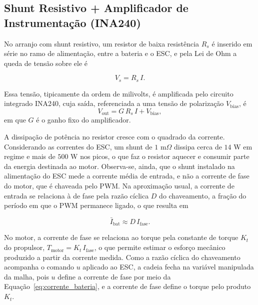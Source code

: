 \subsection{Shunt Resistivo + Amplificador de Instrumentação (INA240)}
\label{sec:ina240}

No arranjo com shunt resistivo, um resistor de baixa resistência $R_s$ é inserido em
série no ramo de alimentação, entre a bateria e o ESC, e pela Lei de Ohm a queda de tensão
sobre ele é

\begin{equation*}
V_s = R_s\,I.
\end{equation*}

Essa tensão, tipicamente da ordem de milivolts, é amplificada pelo circuito integrado INA240, cuja
saída, referenciada a uma tensão de polarização $V_\mathrm{bias}$, é
\begin{equation*}
V_\mathrm{out} = G\,R_s\,I + V_\mathrm{bias},
\end{equation*}
em que $G$ é o ganho fixo do amplificador. 

A dissipação de potência no resistor cresce com o quadrado da corrente. Considerando as correntes do
ESC, um shunt de $1$ m$\Omega$ dissipa cerca de $14$ W
em regime e mais de $500$ W nos picos, o que faz o resistor aquecer e consumir parte da energia
destinada ao motor. Observa-se, ainda, que o shunt instalado na alimentação do ESC mede a
corrente média de entrada, e não a corrente de fase do motor, que é chaveada pelo PWM. Na aproximação
usual, a corrente de entrada se relaciona à de fase pela razão cíclica $D$ do chaveamento, a
fração do período em que o PWM permanece ligado, o que resulta em

\begin{equation}\label{eq:corrente_bateria}
\bar{I}_\mathrm{bat} \approx D\,I_\mathrm{fase}.
\end{equation}

No motor, a corrente de fase se relaciona ao torque pela constante de torque $K_t$ do
propulsor, $T_{\mathrm{motor}} = K_t\,I_{\mathrm{fase}}$, o que permite estimar o esforço
mecânico produzido a partir da corrente medida. Como a razão cíclica do chaveamento acompanha
o comando $u$ aplicado ao ESC, a cadeia fecha na variável manipulada da malha, pois $u$
define a corrente de fase por meio da Equação~\eqref{eq:corrente_bateria}, e a corrente de
fase define o torque pelo produto $K_t$.

